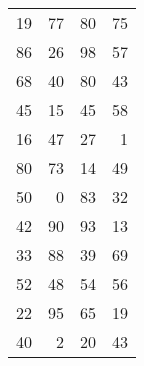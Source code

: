 \documentclass[11pt, a4paper]{article}
\begin{document}
\begin{table}[htb]
    \centering
    \begin{tabular}{@{}rrrr@{}}
        \toprule
        19 & 77 & 80 & 75 \\
        86 & 26 & 98 & 57 \\
        68 & 40 & 80 & 43 \\
        45 & 15 & 45 & 58 \\
        16 & 47 & 27 & 1 \\
        80 & 73 & 14 & 49 \\
        50 & 0 & 83 & 32 \\
        42 & 90 & 93 & 13 \\
        33 & 88 & 39 & 69 \\
        52 & 48 & 54 & 56 \\
        22 & 95 & 65 & 19 \\
        40 & 2 & 20 & 43 \\
        \bottomrule
    \end{tabular}
\end{table}
\end{document}
